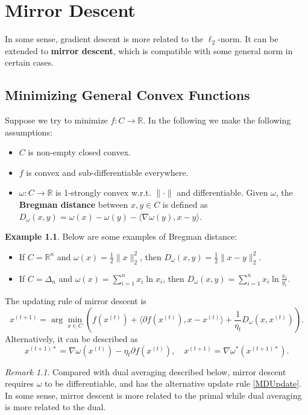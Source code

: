 \documentclass[openany]{book}
\theoremstyle{definition}
\newtheorem{example}{Example}[chapter]
\theoremstyle{remark}
\newtheorem*{remark}{Remark}
\begin{document}
\chapter{Mirror Descent}\label{chp:MD}
In some sense, gradient descent is more related to the $\ell_2$-norm. It can be extended to \textbf{mirror descent}, which is compatible with some general norm in certain cases.

\section{Minimizing General Convex Functions}
Suppose we try to minimize $f:C\to \mathbb{R}$. In the following we make the following assumptions:
\begin{itemize}
    \item $C$ is non-empty closed convex.
    \item $f$ is convex and sub-differentiable everywhere.
    \item $\omega:C\to \mathbb{R}$ is 1-strongly convex w.r.t. $\|\cdot\|$ and differentiable. Given $\omega$, the \textbf{Bregman distance} between $x,y\in C$ is defined as $D_{\omega}(x,y)=\omega(x)-\omega(y)-\langle\nabla\omega(y),x-y\rangle$.
\end{itemize}
\begin{example}
    Below are some examples of Bregman distance:
    \begin{itemize}
        \item If $C=\mathbb{R}^n$ and $\omega(x)=\frac{1}{2}\|x\|_2^2$, then $D_{\omega}(x,y)=\frac{1}{2}\|x-y\|_2^2$.
        \item If $C=\Delta_n$ and $\omega(x)=\sum_{i=1}^{n}x_i\ln x_i$, then $D_{\omega}(x,y)=\sum_{i=1}^{n}x_i\ln \frac{x_i}{y_i}$.
    \end{itemize}
\end{example}

The updating rule of mirror descent is
\begin{equation}\label{MDUpdate}
    x^{(t+1)}=\arg\min_{x\in C}\left(f(x^{(t)})+\langle\partial f(x^{(t)}),x-x^{(t)}\rangle+\frac{1}{\eta_t}D_{\omega}(x,x^{(t)})\right).
\end{equation}
Alternatively, it can be described as
\begin{equation}\label{MDUpdateAlt}
    x^{(t+1)*}=\nabla\omega(x^{(t)})-\eta_t\partial f(x^{(t)}),\quad x^{(t+1)}=\nabla\omega^*(x^{(t+1)*}).
\end{equation}
\begin{remark}
    Compared with dual averaging described below, mirror descent requires $\omega$ to be differentiable, and has the alternative update rule \eqref{MDUpdate}. In some sense, mirror descent is more related to the primal while dual averaging is more related to the dual.
\end{remark}
\end{document}
